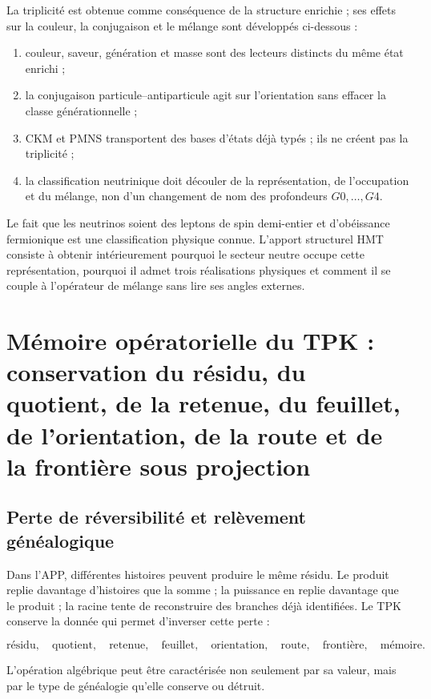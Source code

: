 La triplicité est obtenue comme conséquence de la structure enrichie ; ses effets sur la couleur, la conjugaison et le mélange sont développés ci-dessous :

\begin{enumerate}
\item couleur, saveur, génération et masse sont des lecteurs distincts du même état enrichi ;
\item la conjugaison particule–antiparticule agit sur l’orientation sans effacer la classe générationnelle ;
\item CKM et PMNS transportent des bases d’états déjà typés ; ils ne créent pas la triplicité ;
\item la classification neutrinique doit découler de la représentation, de l’occupation et du mélange, non d’un changement de nom des profondeurs \(G0,\ldots,G4\).
\end{enumerate}

Le fait que les neutrinos soient des leptons de spin demi-entier et d’obéissance fermionique est une classification physique connue. L’apport structurel HMT consiste à obtenir intérieurement pourquoi le secteur neutre occupe cette représentation, pourquoi il admet trois réalisations physiques et comment il se couple à l’opérateur de mélange sans lire ses angles externes.


\section{Mémoire opératorielle du TPK : conservation du résidu, du quotient, de la retenue, du feuillet, de l’orientation, de la route et de la frontière sous projection}

\subsection{Perte de réversibilité et relèvement généalogique}

Dans l’APP, différentes histoires peuvent produire le même résidu. Le produit replie davantage d’histoires que la somme ; la puissance en replie davantage que le produit ; la racine tente de reconstruire des branches déjà identifiées. Le TPK conserve la donnée qui permet d’inverser cette perte :

\[
\text{résidu},\quad
\text{quotient},\quad
\text{retenue},\quad
\text{feuillet},\quad
\text{orientation},\quad
\text{route},\quad
\text{frontière},\quad
\text{mémoire}.
\]

L’opération algébrique peut être caractérisée non seulement par sa valeur, mais par le type de généalogie qu’elle conserve ou détruit.

